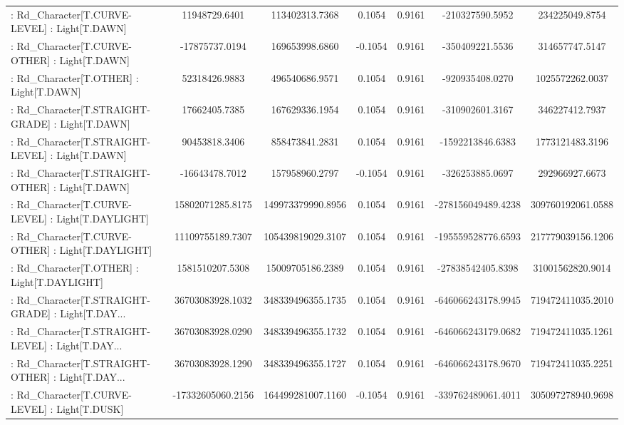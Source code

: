 \begin{longtable}{p{4cm}cccccc}
 : Rd\_Character[T.CURVE-LEVEL] : Light[T.DAWN]     &     11948729.6401 &    113402313.7368 &  0.1054 &       0.9161 &    -210327590.5952 &    234225049.8754 \\
 : Rd\_Character[T.CURVE-OTHER] : Light[T.DAWN]     &    -17875737.0194 &    169653998.6860 & -0.1054 &       0.9161 &    -350409221.5536 &    314657747.5147 \\
 : Rd\_Character[T.OTHER] : Light[T.DAWN]           &     52318426.9883 &    496540686.9571 &  0.1054 &       0.9161 &    -920935408.0270 &   1025572262.0037 \\
 : Rd\_Character[T.STRAIGHT-GRADE] : Light[T.DAWN]  &     17662405.7385 &    167629336.1954 &  0.1054 &       0.9161 &    -310902601.3167 &    346227412.7937 \\
 : Rd\_Character[T.STRAIGHT-LEVEL] : Light[T.DAWN]  &     90453818.3406 &    858473841.2831 &  0.1054 &       0.9161 &   -1592213846.6383 &   1773121483.3196 \\
 : Rd\_Character[T.STRAIGHT-OTHER] : Light[T.DAWN]  &    -16643478.7012 &    157958960.2797 & -0.1054 &       0.9161 &    -326253885.0697 &    292966927.6673 \\
 : Rd\_Character[T.CURVE-LEVEL] : Light[T.DAYLIGHT] &  15802071285.8175 & 149973379990.8956 &  0.1054 &       0.9161 & -278156049489.4238 & 309760192061.0588 \\
 : Rd\_Character[T.CURVE-OTHER] : Light[T.DAYLIGHT] &  11109755189.7307 & 105439819029.3107 &  0.1054 &       0.9161 & -195559528776.6593 & 217779039156.1206 \\
 : Rd\_Character[T.OTHER] : Light[T.DAYLIGHT]       &   1581510207.5308 &  15009705186.2389 &  0.1054 &       0.9161 &  -27838542405.8398 &  31001562820.9014 \\
 : Rd\_Character[T.STRAIGHT-GRADE] : Light[T.DAY... &  36703083928.1032 & 348339496355.1735 &  0.1054 &       0.9161 & -646066243178.9945 & 719472411035.2010 \\
 : Rd\_Character[T.STRAIGHT-LEVEL] : Light[T.DAY... &  36703083928.0290 & 348339496355.1732 &  0.1054 &       0.9161 & -646066243179.0682 & 719472411035.1261 \\
 : Rd\_Character[T.STRAIGHT-OTHER] : Light[T.DAY... &  36703083928.1290 & 348339496355.1727 &  0.1054 &       0.9161 & -646066243178.9670 & 719472411035.2251 \\
 : Rd\_Character[T.CURVE-LEVEL] : Light[T.DUSK]     & -17332605060.2156 & 164499281007.1160 & -0.1054 &       0.9161 & -339762489061.4011 & 305097278940.9698 \\

\end{longtable}
